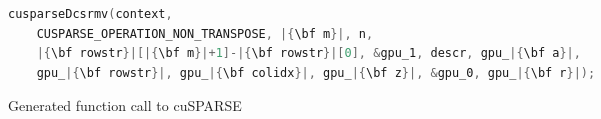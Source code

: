 \begin{lstlisting}[escapechar=|,mathescape,commentstyle=\color{gray}\itshape,language=C]
cusparseDcsrmv(context,
    CUSPARSE_OPERATION_NON_TRANSPOSE, |{\bf m}|, n,
    |{\bf rowstr}|[|{\bf m}|+1]-|{\bf rowstr}|[0], &gpu_1, descr, gpu_|{\bf a}|,
    gpu_|{\bf rowstr}|, gpu_|{\bf colidx}|, gpu_|{\bf z}|, &gpu_0, gpu_|{\bf r}|);
\end{lstlisting}
\vspace{-0.287cm}
\caption{Generated function call to cuSPARSE}
\label{fig:spmvexample3}